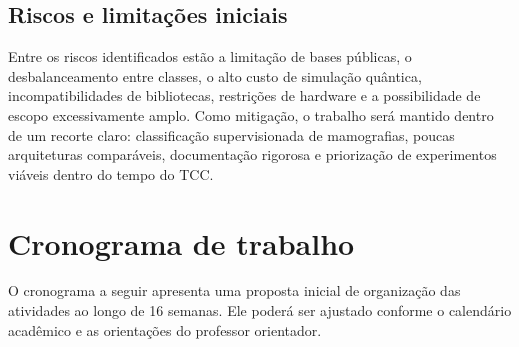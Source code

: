 \documentclass[
    12pt,
    openright,
    oneside,
    a4paper,
    english,
    brazil
]{abntex2}
\begin{document}
\subsection*{Riscos e limitações iniciais}

Entre os riscos identificados estão a limitação de bases públicas, o desbalanceamento entre classes, o alto custo de simulação quântica, incompatibilidades de bibliotecas, restrições de hardware e a possibilidade de escopo excessivamente amplo. Como mitigação, o trabalho será mantido dentro de um recorte claro: classificação supervisionada de mamografias, poucas arquiteturas comparáveis, documentação rigorosa e priorização de experimentos viáveis dentro do tempo do TCC.

\section{Cronograma de trabalho}
\label{sec:cronograma}

O cronograma a seguir apresenta uma proposta inicial de organização das atividades ao longo de 16 semanas. Ele poderá ser ajustado conforme o calendário acadêmico e as orientações do professor orientador.
\end{document}
